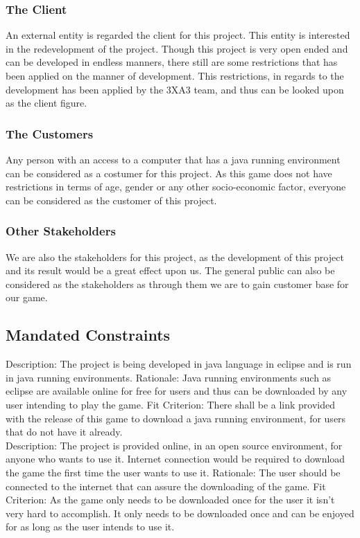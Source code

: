 \documentclass[12pt,letterpaper]{article}
\begin{document}
	\subsubsection{The Client}
	An external entity is regarded the client for this project. This entity is interested in the redevelopment of the project. Though this project is very open ended and can be developed in endless manners, there still are some restrictions that has been applied on the manner of development. This restrictions, in regards to the development has been applied by the 3XA3 team, and thus can be looked upon as the client figure.			
	\subsubsection{The Customers}
	Any person with an access to a computer that has a java running environment can be considered as a costumer for this project. As this game does not have restrictions in terms of age, gender or any other socio-economic factor, everyone can be considered as the customer of this project.
	\subsubsection{Other Stakeholders}
	We are also the stakeholders for this project, as the development of this project and its result would be a great effect upon us. The general public can also be considered as the stakeholders as through them we are to gain customer base for our game.
	
	\subsection{Mandated Constraints}
	Description: The project is being developed in java language in eclipse and is run in java running environments.
Rationale: Java running environments such as eclipse are available online for free for users and thus can be downloaded by any user intending to play the game.
Fit Criterion: There shall be a link provided with the release of this game to download a java running environment, for users that do not have it already.\\


\noindent Description: The project is provided online, in an open source environment, for anyone who wants to use it. Internet connection would be required to download the game the first time the user wants to use it.
Rationale: The user should be connected to the internet that can assure the downloading of the game.
Fit Criterion: As the game only needs to be downloaded once for the user it isn’t very hard to accomplish. It only needs to be downloaded once and can be enjoyed for as long as the user intends to use it.
	
\end{document}
